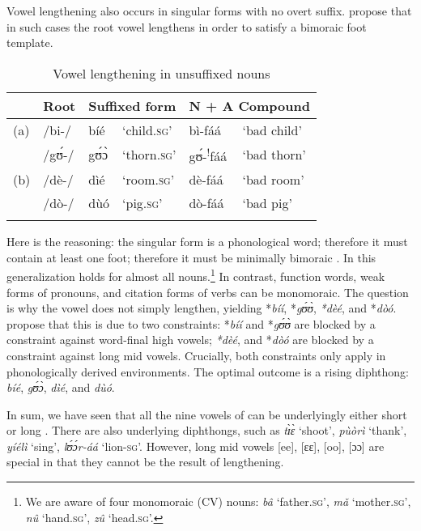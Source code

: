 \documentclass[output=paper
,newtxmath
,modfonts
,nonflat]{langsci/langscibook}
\begin{document}
{Vowel lengthening also occurs in singular forms with no overt suffix. \citet{Anttila&Bodomo2009} propose that in such cases the root vowel lengthens in order to satisfy a bimoraic foot template.}

\begin{table}
\begin{tabularx}{\textwidth}{lXlXlX}
\lsptoprule
& {Root} & \multicolumn{2}{l}{{Suffixed form}}  & \multicolumn{2}{l}{{N + A Compound}} \\
\midrule
(a) & /bi-/ & bíé & ‘child.\textsc{sg}’ & bì-fáá & ‘bad child’\\
& /gʊ́-/ & gʊ́ɔ̀ & ‘thorn.\textsc{sg}’ & gʊ́-\textsuperscript{!}fáá & ‘bad thorn’\\
(b) & /dè-/ & dìé & ‘room.\textsc{sg}’ & dè-fáá & ‘bad room’\\
& /dò-/ & dùó & ‘pig.\textsc{sg}’ & dò-fáá & ‘bad pig’\\
\lspbottomrule
\end{tabularx}
\caption{Vowel lengthening in unsuffixed nouns}
\label{tab:anttila:4}
\end{table}
 

{Here is the reasoning: the singular form is a phonological word; therefore it must contain at least one foot; therefore it must be minimally bimoraic \citep{McCarthyPrince1996}. In  this generalization holds for almost all nouns.}\footnote{We are aware of four monomoraic (CV) nouns: \textit{bâ} ‘father.\textsc{sg}’, \textit{mǎ} ‘mother.\textsc{sg}’, \textit{nû} ‘hand.\textsc{sg’,} \textit{zû} ‘head.\textsc{sg}’.}{  In contrast, function words, weak forms of pronouns, and citation forms of verbs can be monomoraic. The question is why the vowel does not simply lengthen, yielding *}{\textit{bíí}}{, *}{\textit{g}}{\textit{ʊ́ʊ̀}}{,} {\textit{*}}{\textit{dèé}}{, and *}{\textit{dòó}}{.} {} \citet{Anttila&Bodomo2009} propose that this is due to two constraints: {*}{\textit{bíí}}{ and *}{\textit{g}}{\textit{ʊ́ʊ̀}}{} {are blocked by a constraint against word-final high vowels;} {\textit{*}}{\textit{dèé}}{, and *}{\textit{dòó} }{are blocked by} {a constraint against long mid vowels. Crucially, both constraints only apply in phonologically derived environments. The optimal outcome is} {a rising diphthong:} {\textit{bíé}}{,} {\textit{g}}{\textit{ʊ́ɔ̀}}{,} {\textit{dìé}}{, and} {\textit{dùó}}{.} 



{In sum, we have seen that all the nine vowels of  can be underlyingly either short or long \citep{Kennedy1966}. There are also underlying diphthongs, such as} {\textit{t\`ɪ\`ɛ}}{ ‘shoot’,} {\textit{pùòrì}}{ ‘thank’,} {\textit{yíélì}}{ ‘sing’,} {\textit{lʊ́ɔ́r-áá}}{ ‘lion-}{\textsc{sg}}{’. However, long mid vowels} {[ee], [ɛɛ], [oo], [ɔɔ]} {are special in that they cannot be the result of lengthening.}
\end{document}
